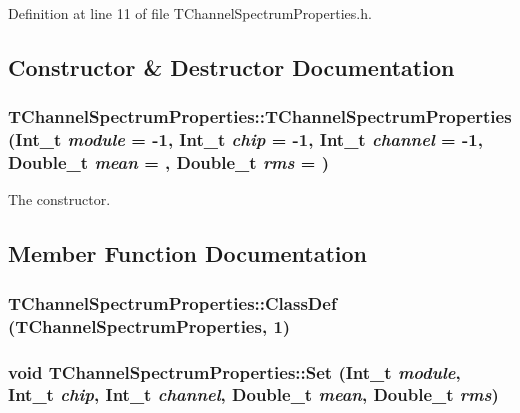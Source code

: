 Definition at line 11 of file TChannelSpectrumProperties.h.

\subsection{Constructor \& Destructor Documentation}
\hypertarget{class_t_channel_spectrum_properties_ac1d3286952893fa565cbfd8227e84ff3}{
\subsubsection[{TChannelSpectrumProperties}]{\setlength{\rightskip}{0pt plus 5cm}TChannelSpectrumProperties::TChannelSpectrumProperties (Int\_\-t {\em module} = {\ttfamily -\/1}, \/  Int\_\-t {\em chip} = {\ttfamily -\/1}, \/  Int\_\-t {\em channel} = {\ttfamily -\/1}, \/  Double\_\-t {\em mean} = {}, \/  Double\_\-t {\em rms} = {})}}
\label{class_t_channel_spectrum_properties_ac1d3286952893fa565cbfd8227e84ff3}


The constructor. 

\subsection{Member Function Documentation}
\hypertarget{class_t_channel_spectrum_properties_a4b92e78edcf807e0353d5b059c55aa9c}{
\subsubsection[{ClassDef}]{\setlength{\rightskip}{0pt plus 5cm}TChannelSpectrumProperties::ClassDef ({\bf TChannelSpectrumProperties}, \/  1)}}
\label{class_t_channel_spectrum_properties_a4b92e78edcf807e0353d5b059c55aa9c}
\hypertarget{class_t_channel_spectrum_properties_a3ddfb6dfbbed5b502f1ddf5a40c387ba}{
\subsubsection[{Set}]{\setlength{\rightskip}{0pt plus 5cm}void TChannelSpectrumProperties::Set (Int\_\-t {\em module}, \/  Int\_\-t {\em chip}, \/  Int\_\-t {\em channel}, \/  Double\_\-t {\em mean}, \/  Double\_\-t {\em rms})}}
\label{class_t_channel_spectrum_properties_a3ddfb6dfbbed5b502f1ddf5a40c387ba}


